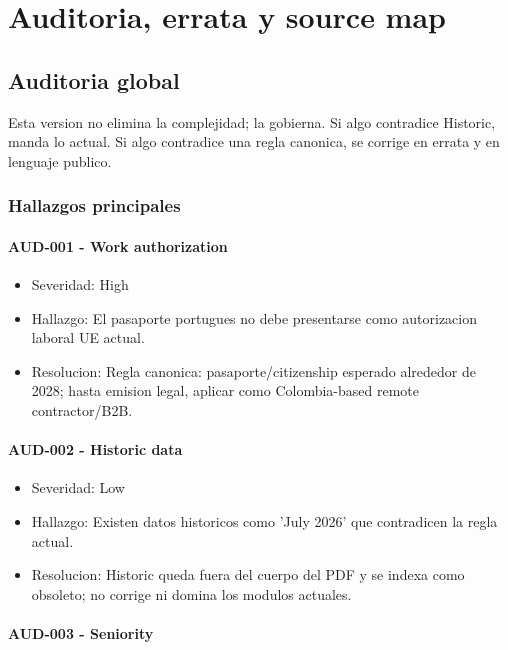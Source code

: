 \chapter{Auditoria, errata y source map}

\section{Auditoria global}


Esta version no elimina la complejidad; la gobierna. Si algo contradice Historic, manda lo actual. Si algo contradice una regla canonica, se corrige en errata y en lenguaje publico.


\subsection{Hallazgos principales}


\subsubsection{AUD-001 - Work authorization}


\begin{itemize}
\item Severidad: High
\item Hallazgo: El pasaporte portugues no debe presentarse como autorizacion laboral UE actual.
\item Resolucion: Regla canonica: pasaporte/citizenship esperado alrededor de 2028; hasta emision legal, aplicar como Colombia-based remote contractor/B2B.
\end{itemize}


\subsubsection{AUD-002 - Historic data}


\begin{itemize}
\item Severidad: Low
\item Hallazgo: Existen datos historicos como 'July 2026' que contradicen la regla actual.
\item Resolucion: Historic queda fuera del cuerpo del PDF y se indexa como obsoleto; no corrige ni domina los modulos actuales.
\end{itemize}


\subsubsection{AUD-003 - Seniority}


